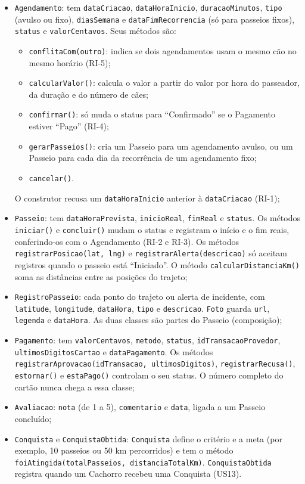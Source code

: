 \begin{itemize}
	\item \texttt{Agendamento}: tem \texttt{dataCriacao}, \texttt{dataHoraInicio}, \texttt{duracaoMinutos}, \texttt{tipo} (avulso ou fixo), \texttt{diasSemana} e \texttt{dataFimRecorrencia} (só para passeios fixos), \texttt{status} e \texttt{valorCentavos}. Seus métodos são:
	\begin{itemize}
		\item \texttt{conflitaCom(outro)}: indica se dois agendamentos usam o mesmo cão no mesmo horário (RI-5);
		\item \texttt{calcularValor()}: calcula o valor a partir do valor por hora do passeador, da duração e do número de cães;
		\item \texttt{confirmar()}: só muda o status para ``Confirmado'' se o Pagamento estiver ``Pago'' (RI-4);
		\item \texttt{gerarPasseios()}: cria um Passeio para um agendamento avulso, ou um Passeio para cada dia da recorrência de um agendamento fixo;
		\item \texttt{cancelar()}.
	\end{itemize}
	O construtor recusa um \texttt{dataHoraInicio} anterior à \texttt{dataCriacao} (RI-1);

	\item \texttt{Passeio}: tem \texttt{dataHoraPrevista}, \texttt{inicioReal}, \texttt{fimReal} e \texttt{status}. Os métodos \texttt{iniciar()} e \texttt{concluir()} mudam o status e registram o início e o fim reais, conferindo-os com o Agendamento (RI-2 e RI-3). Os métodos \texttt{registrarPosicao(lat, lng)} e \texttt{registrarAlerta(descricao)} só aceitam registros quando o passeio está ``Iniciado''. O método \texttt{calcularDistanciaKm()} soma as distâncias entre as posições do trajeto;

	\item \texttt{RegistroPasseio}: cada ponto do trajeto ou alerta de incidente, com \texttt{latitude}, \texttt{longitude}, \texttt{dataHora}, \texttt{tipo} e \texttt{descricao}. \texttt{Foto} guarda \texttt{url}, \texttt{legenda} e \texttt{dataHora}. As duas classes são partes do Passeio (composição);

	\item \texttt{Pagamento}: tem \texttt{valorCentavos}, \texttt{metodo}, \texttt{status}, \texttt{idTransacaoProvedor}, \texttt{ultimosDigitosCartao} e \texttt{dataPagamento}. Os métodos \texttt{registrarAprovacao(idTransacao, ultimosDigitos)}, \texttt{registrarRecusa()}, \texttt{estornar()} e \texttt{estaPago()} controlam o seu status. O número completo do cartão nunca chega a essa classe;

	\item \texttt{Avaliacao}: \texttt{nota} (de 1 a 5), \texttt{comentario} e \texttt{data}, ligada a um Passeio concluído;

	\item \texttt{Conquista} e \texttt{ConquistaObtida}: \texttt{Conquista} define o critério e a meta (por exemplo, 10 passeios ou 50 km percorridos) e tem o método \texttt{foiAtingida(totalPasseios, distanciaTotalKm)}. \texttt{ConquistaObtida} registra quando um Cachorro recebeu uma Conquista (US13).
\end{itemize}

